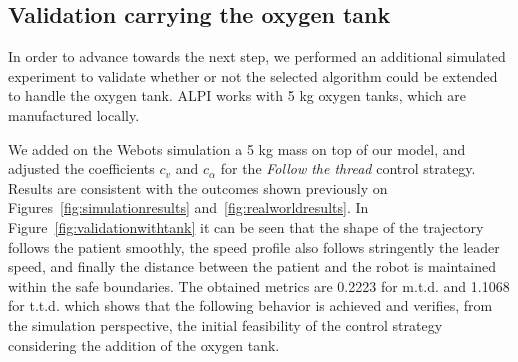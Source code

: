 \documentclass[journal]{IEEEtran}
\begin{document}
\subsection{Validation carrying the oxygen tank}

In order to advance towards the next step, we performed an additional simulated experiment to validate whether or not the selected algorithm could be extended to  handle the oxygen tank.  ALPI works with 5 kg oxygen tanks, which are manufactured locally.

We added on the Webots simulation a 5 kg mass on top of our model, and adjusted the coefficients $c_v$ and $c_{\alpha}$ for the  \textit{Follow the thread}  control strategy.  Results are consistent with the outcomes shown previously on Figures~\ref{fig:simulationresults} and~\ref{fig:realworldresults}.  In Figure~\ref{fig:validationwithtank} it can be seen that the shape of the trajectory follows the patient smoothly, the speed profile also follows stringently the leader speed, and finally the distance between the patient and the robot is maintained within the safe boundaries.  The obtained metrics are 0.2223 for m.t.d. and 1.1068 for t.t.d. which shows that the following behavior is achieved and verifies, from the simulation perspective, the initial feasibility of the control strategy considering the addition of the oxygen tank.
\end{document}
